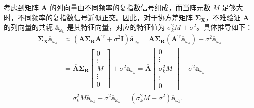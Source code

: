 考虑到矩阵 \(\mathbf{A}\) 的列向量由不同频率的复指数信号组成，而当阵元数 \(M\) 足够大时，不同频率的复指数信号近似正交。因此，对于协方差矩阵 \(\mathbf{\Sigma}_{\mathbf{X}}\)，不难验证 \(\mathbf{A}\) 的列向量的共轭 \(\overline{\bm{a}}_{\omega_k}\) 是其特征向量，对应的特征值为 \(\sigma_k^2 M + \sigma^2\)。具体推导如下：
\[
    \begin{split}
        \mathbf{\Sigma}_{\mathbf{X}} \overline{\bm{a}}_{\omega_k}
         & \approx \left( \overline{\mathbf{A}} \mathbf{\Sigma}_{\mathbf{R}} \mathbf{A}^{\mathrm{T}} + \sigma^2 \mathbf{I} \right) \overline{\bm{a}}_{\omega_k}
        = \overline{\mathbf{A}} \mathbf{\Sigma}_{\mathbf{R}} \left( \mathbf{A}^{\mathrm{T}} \overline{\bm{a}}_{\omega_k} \right) + \sigma^2 \overline{\bm{a}}_{\omega_k}                            \\
         & = \overline{\mathbf{A}} \mathbf{\Sigma}_{\mathbf{R}} \begin{bmatrix}
                                                                    0      \\
                                                                    \vdots \\
                                                                    M      \\
                                                                    \vdots \\
                                                                    0
                                                                \end{bmatrix} + \sigma^2 \overline{\bm{a}}_{\omega_k} = \overline{\mathbf{A}} \begin{bmatrix}
                                                                                                                                                  0            \\
                                                                                                                                                  \vdots       \\
                                                                                                                                                  \sigma_k^2 M \\
                                                                                                                                                  \vdots       \\
                                                                                                                                                  0
                                                                                                                                              \end{bmatrix} + \sigma^2 \overline{\bm{a}}_{\omega_k} \\
         & = \sigma_k^2 M \overline{\bm{a}}_{\omega_k} + \sigma^2 \overline{\bm{a}}_{\omega_k}
        = \left( \sigma_k^2 M + \sigma^2 \right) \overline{\bm{a}}_{\omega_k}.
    \end{split}
\]

